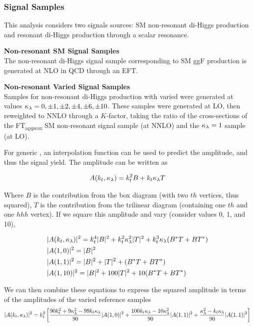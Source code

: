 \subsubsection{Signal Samples}

This analysis considers two signals sources: \gls{SM} non-resonant di-Higgs production and resonant di-Higgs production through a scalar resonance.

\noindent\textbf{Non-resonant \gls{SM} Signal Samples}\\
\indent The non-resonant di-Higgs signal sample corresponding to \gls{SM} \gls{ggF} \hh production is generated at \gls{NLO} in \gls{QCD} through an \gls{EFT}.

\noindent\textbf{Non-resonant Varied \klambda Signal Samples}\\
\indent Samples for non-resonant di-Higgs production with varied \klambda were generated at values $\kappa_{\lambda} = 0, \pm 1, \pm 2, \pm 4, \pm 6, \pm 10$. These samples were generated at \gls{LO}, then reweighted to \gls{NNLO} through a $K$-factor, taking the ratio of the cross-sections of the FT\textsubscript{approx} \gls{SM} non-resonant signal sample (at \gls{NNLO}) and the $\kappa_{\lambda} =1$ sample (at \gls{LO}).

For generic \klambda, an interpolation function can be used to predict the amplitude, and thus the signal yield. The amplitude can be written as

\begin{equation}
  A(k_t,\kappa_{\lambda}) = k_t^2 B + k_t \kappa_{\lambda} T
\end{equation}

Where $B$ is the contribution from the box diagram (with two $th$ vertices, thus squared), $T$ is the contribution from the trilinear diagram (containing one $th$ and one $hhh$ vertex). If we square this amplitude and vary \klambda (consider values 0, 1, and 10),

\begin{align}
  &|A(k_t,\kappa_{\lambda})|^2 = k_t^4 |B|^2 + k_t^2\kappa_{\lambda}^2 |T|^2 + k_t^3\kappa_{\lambda}(B^*T + BT^*)\\
  &|A(1,0)|^2 = |B|^2\\
  &|A(1,1)|^2 = |B|^2 + |T|^2 + (B^*T + BT^*)\\
  &|A(1,10)|^2 = |B|^2 + 100|T|^2 + 10(B^*T + BT^*)
\end{align}

We can then combine these equations to express the squared amplitude in terms of the amplitudes of the varied reference samples
\begin{equation}
  |A(k_t,\kappa_{\lambda})|^2 = k_t^2 \left[ 
    \frac{90 k_t^2 + 9\kappa_{\lambda}^2 - 99k_t\kappa_{\lambda}}{90}|A(1,0)|^2 +
    \frac{100 k_t\kappa_{\lambda} - 10\kappa_{\lambda}^2}{90}|A(1,1)|^2 +
    \frac{\kappa_{\lambda}^2 - k_t\kappa_{\lambda}}{90}|A(1,1)|^2 \right]
\end{equation}


